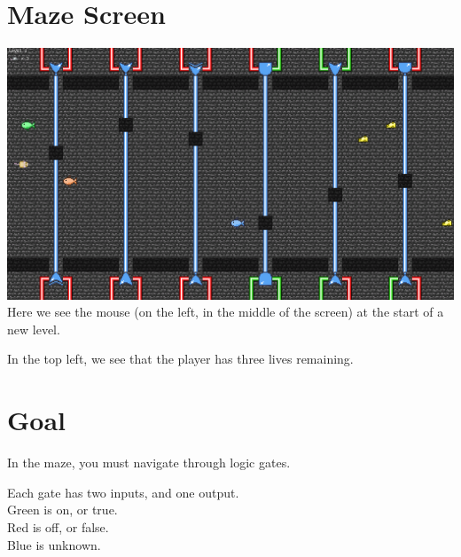 \documentclass[12pt]{book}
\begin{document}
		\section{Maze Screen}
			\includegraphics[width=\textwidth]{MazeScreen}
			\\
			Here we see the mouse (on the left, in the middle of the screen) at the start of a new level.

			In the top left, we see that the player has three lives remaining.
		\section{Goal}
			In the maze, you must navigate through logic gates.

			Each gate has two inputs, and one output.
			\\
			\textcolor{on}{Green is on, or true.}
			\\
			\textcolor{off}{Red is off, or false.}
			\\
			\textcolor{unknown}{Blue is unknown.}
\end{document}
